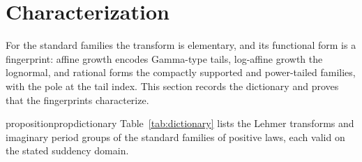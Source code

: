 \documentclass[sn-mathphys-num]{sn-jnl}
\theoremstyle{thmstyleone}%
\theoremstyle{thmstyletwo}%
\theoremstyle{thmstylethree}%
\theoremstyle{thmstyleone}%
\begin{document}
	\section{Characterization}\label{sec:characterization}
	
	For the standard families the transform is elementary, and its
	functional form is a fingerprint: affine growth encodes Gamma-type
	tails, log-affine growth the lognormal, and rational forms the
	compactly supported and power-tailed families, with the pole at the
	tail index. This section records the dictionary and proves that the
	fingerprints characterize.
	
	\begin{restatable}[Dictionary]{proposition}{propdictionary}
		\label{prop:dictionary}
		Table~\ref{tab:dictionary} lists the Lehmer transforms and
		imaginary period groups of the standard families of positive laws,
		each valid on the stated suddency domain.
	\end{restatable}
	
\end{document}
